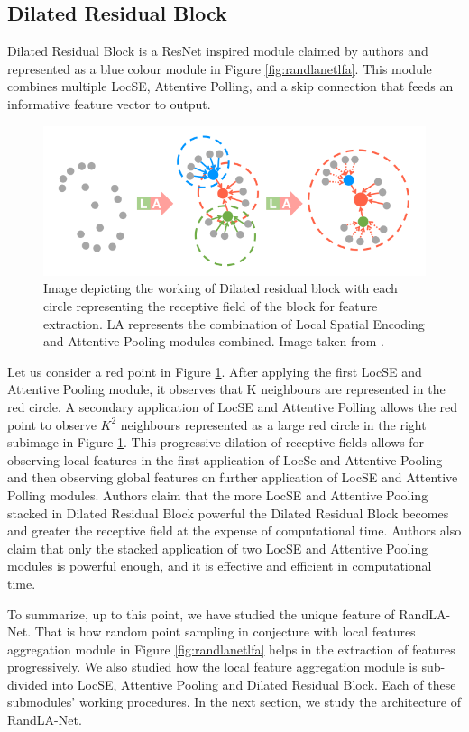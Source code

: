 \subsection{Dilated Residual Block}
Dilated Residual Block is a ResNet inspired module claimed by authors and represented as a blue colour module in Figure \ref{fig:randlanetlfa}.
This module combines multiple LocSE, Attentive Polling, and a skip connection that feeds an informative feature vector to output.
\begin{figure}
    \centering
    \includegraphics[scale=0.5]{images/dilatedresidualblock.png}
    \caption{Image depicting the working of Dilated residual block with each circle representing the receptive field of the block for feature extraction. LA represents the combination of Local Spatial Encoding and Attentive Pooling modules combined. Image taken from \cite{Hu_2020_CVPR_Randla}.}
    \label{fig:dilatedresidualblock}
\end{figure}
Let us consider a red point in Figure \ref{fig:dilatedresidualblock}. After applying the first LocSE and Attentive Pooling module, it observes that K neighbours are represented in the red circle.
A secondary application of LocSE and Attentive Polling allows the red point to observe $K^{2}$ neighbours represented as a large red circle in the right subimage in Figure \ref{fig:dilatedresidualblock}.
This progressive dilation of receptive fields allows for observing local features in the first application of LocSe and Attentive Pooling and then observing global features on further application of LocSE and Attentive Polling modules.
Authors claim that the more LocSE and Attentive Pooling stacked in Dilated Residual Block powerful the Dilated Residual Block becomes and greater the receptive field at the expense of computational time.
Authors also claim that only the stacked application of two LocSE and Attentive Pooling modules is powerful enough, and it is effective and efficient in computational time.

To summarize, up to this point, we have studied the unique feature of RandLA-Net. That is how random point sampling in conjecture with local features aggregation module in Figure \ref{fig:randlanetlfa} helps in the extraction of features progressively.
We also studied how the local feature aggregation module is sub-divided into LocSE, Attentive Pooling and Dilated Residual Block. Each of these submodules' working procedures.
In the next section, we study the architecture of RandLA-Net.

